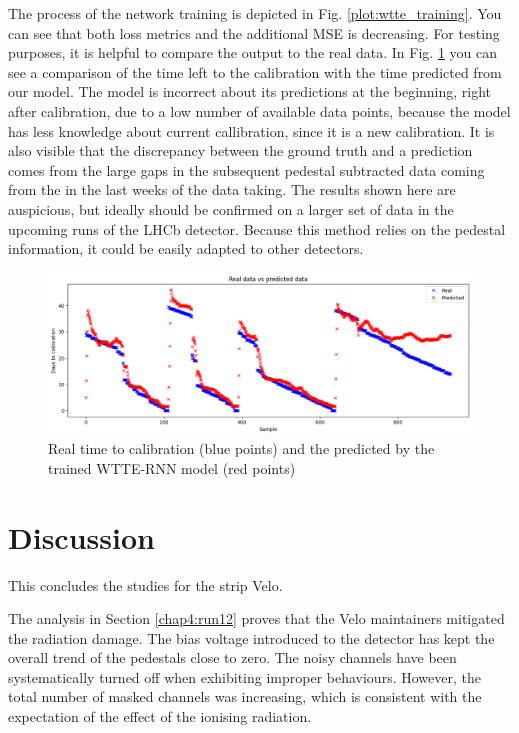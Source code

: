The process of the network training is depicted in Fig. \ref{plot:wtte_training}.
You can see that both loss metrics and the additional MSE is decreasing.
For testing purposes, it is helpful to compare the output to the real data.
In Fig. \ref{plot:wtte_realpred} you can see a comparison of the time left to the calibration with the time predicted from our model.
The model is incorrect about its predictions at the beginning, right after calibration, due to a low number of available data points, because the model has less knowledge about current callibration, since it is a new calibration.
It is also visible that the discrepancy between the ground truth and a prediction comes from the large gaps in the subsequent pedestal subtracted data coming from the  in the last weeks of the data taking.
The results shown here are auspicious, but ideally should be confirmed on a larger set of data in the upcoming runs of the LHCb detector.
Because this method relies on the pedestal information, it could be easily adapted to other detectors.

\begin{figure}
    \centering
    \includegraphics[width=\linewidth]{figures/chapter4/wtte/real_vs_predicted.png}
    \caption{Real time to calibration (blue points) and the predicted by the trained WTTE-RNN model (red points)}
    \label{plot:wtte_realpred}
  \end{figure}

\section{Discussion}

This concludes the studies for the strip Velo. 

The analysis in Section \ref{chap4:run12} proves that the Velo maintainers mitigated the radiation damage. The bias voltage introduced to the detector has kept the overall trend of the pedestals close to zero. The noisy channels have been systematically turned off when exhibiting improper behaviours. However, the total number of masked channels was increasing, which is consistent with the expectation of the effect of the ionising radiation.

